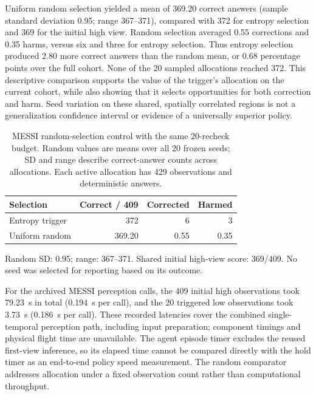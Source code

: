 Uniform random selection yielded a mean of 369.20 correct answers (sample standard deviation 0.95; range 367--371), compared with 372 for entropy selection and 369 for the initial high view. Random selection averaged 0.55 corrections and 0.35 harms, versus six and three for entropy selection. Thus entropy selection produced 2.80 more correct answers than the random mean, or 0.68 percentage points over the full cohort. None of the 20 sampled allocations reached 372. This descriptive comparison supports the value of the trigger's allocation on the current cohort, while also showing that it selects opportunities for both correction and harm. Seed variation on these shared, spatially correlated regions is not a generalization confidence interval or evidence of a universally superior policy.

\begin{table}[htbp]
\centering\small
\caption{MESSI random-selection control with the same 20-recheck budget. Random values are means over all 20 frozen seeds; SD and range describe correct-answer counts across allocations. Each active allocation has 429 observations and deterministic answers.}
\label{tab:messi-random-budget}
\begin{tabularx}{\linewidth}{@{}Xrrr@{}}
\toprule
Selection & Correct / 409 & Corrected & Harmed\\
\midrule
Entropy trigger & 372 & 6 & 3\\
Uniform random & 369.20 & 0.55 & 0.35\\
\bottomrule
\end{tabularx}
\par\smallskip\footnotesize Random SD: 0.95; range: 367--371. Shared initial high-view score: 369/409. No seed was selected for reporting based on its outcome.
\end{table}

For the archived MESSI perception calls, the 409 initial high observations took 79.23~s in total (0.194~s per call), and the 20 triggered low observations took 3.73~s (0.186~s per call). These recorded latencies cover the combined single-temporal perception path, including input preparation; component timings and physical flight time are unavailable. The agent episode timer excludes the reused first-view inference, so its elapsed time cannot be compared directly with the hold timer as an end-to-end policy speed measurement. The random comparator addresses allocation under a fixed observation count rather than computational throughput.
